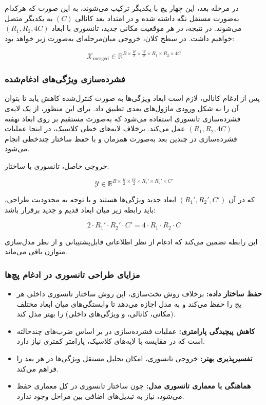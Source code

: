 در مرحله بعد، این چهار پچ با یکدیگر ترکیب می‌شوند، به این صورت که هرکدام به‌صورت مستقل نگه داشته شده و در امتداد بعد کانالی $(C)$ به یکدیگر متصل می‌شوند. در نتیجه، در هر موقعیت مکانی جدید، تانسوری با ابعاد $(R_1, R_2, 4C)$ خواهیم داشت. در سطح کلان، خروجی میان‌مرحله‌ای به‌صورت زیر خواهد بود:

\[
\mathcal{X}_{\text{merged}} \in \mathbb{R}^{B \times \frac{H}{2} \times \frac{W}{2} \times R_1 \times R_2 \times 4C}
\]

\subsubsection*{فشرده‌سازی ویژگی‌های ادغام‌شده}

پس از ادغام کانالی، لازم است ابعاد ویژگی‌ها به صورت کنترل‌شده کاهش یابد تا بتوان آن را به شکل ورودی ماژول‌های بعدی تطبیق داد. برای این منظور، از یک لایه‌ی فشرده‌سازی تانسوری استفاده می‌شود که به‌صورت مستقیم بر روی ابعاد نهفته $(R_1, R_2, 4C)$ عمل می‌کند. برخلاف لایه‌های خطی کلاسیک، در اینجا عملیات فشرده‌سازی در چندین بعد به‌صورت همزمان و با حفظ ساختار چندخطی انجام می‌شود.

خروجی حاصل، تانسوری با ساختار:

\[
\mathcal{Y} \in \mathbb{R}^{B \times \frac{H}{2} \times \frac{W}{2} \times R_1' \times R_2' \times C'}
\]

که در آن $(R_1', R_2', C')$ ابعاد جدید ویژگی‌ها هستند و با توجه به محدودیت طراحی، باید رابطه زیر میان ابعاد قدیم و جدید برقرار باشد:

\[
2 \cdot R_1' \cdot R_2' \cdot C' = 4 \cdot R_1 \cdot R_2 \cdot C
\]

این رابطه تضمین می‌کند که ادغام از نظر اطلاعاتی قابل‌پشتیبانی و از نظر مدل‌سازی متوازن باقی می‌ماند.

\subsubsection*{مزایای طراحی تانسوری در ادغام پچ‌ها}

\begin{itemize}
	\item \textbf{حفظ ساختار داده:} برخلاف روش تخت‌سازی، این روش ساختار تانسوری داخلی هر پچ را حفظ می‌کند و به مدل اجازه می‌دهد تا وابستگی‌های میان ابعاد مختلف (مکانی، کانالی، و ویژگی‌های داخلی) را بهتر مدل کند.
	\item \textbf{کاهش پیچیدگی پارامتری:} عملیات فشرده‌سازی در  بر اساس ضرب‌های چندحالته است که در مقایسه با لایه‌های  کلاسیک، پارامتر کمتری نیاز دارد.
	\item \textbf{تفسیرپذیری بهتر:} خروجی تانسوری، امکان تحلیل مستقل ویژگی‌ها در هر بعد را فراهم می‌کند.
	\item \textbf{هماهنگی با معماری تانسوری مدل:} چون ساختار تانسوری در کل معماری حفظ می‌شود، نیاز به تبدیل‌های اضافی بین مراحل وجود ندارد.
\end{itemize}





